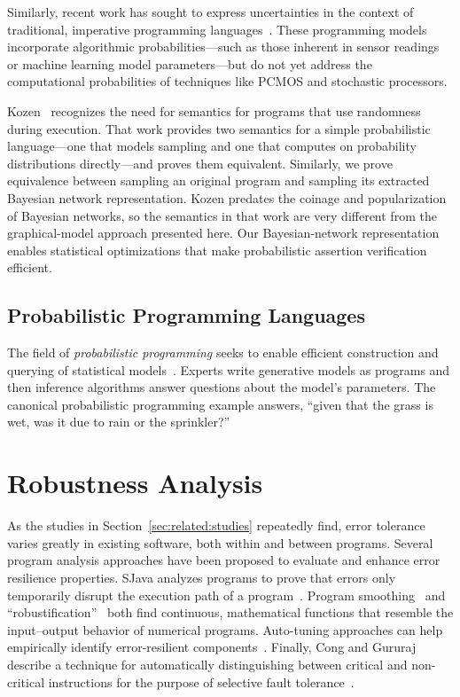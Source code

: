 Similarly, recent work has sought to express
uncertainties in the context of traditional, imperative programming
languages~\cite{uncertaint}. These programming models incorporate algorithmic
probabilities---such as those inherent in sensor readings or machine learning
model parameters---but do not yet address the computational probabilities of
techniques like PCMOS and stochastic processors.

Kozen~\cite{kozen} recognizes the need for semantics for programs
that use randomness during execution.
That work provides two semantics for a simple probabilistic
language---one that models sampling and one that computes on probability
distributions directly---and proves them equivalent.
Similarly, we prove equivalence between sampling an original program and
sampling its extracted Bayesian network representation.
Kozen predates the coinage and popularization of Bayesian networks, so
the semantics in that work are very different from the graphical-model approach
presented here.
Our Bayesian-network representation enables statistical optimizations that
make probabilistic assertion verification efficient.

\subsection{Probabilistic Programming Languages}

The field of \emph{probabilistic programming} seeks to enable efficient
construction and querying of statistical models~\cite{BBGR13, wingate-lightweight,
  church, chaganty, pfeffersample, probdsl, koller}.  Experts write
generative models as programs and then inference algorithms answer questions
about the model's parameters. The canonical probabilistic programming example
answers, ``given that the grass is wet, was it due to rain or the sprinkler?''




\section{Robustness Analysis}

As the studies in Section~\ref{sec:related:studies} repeatedly find, error
tolerance varies greatly in existing software, both within and between
programs. Several program analysis approaches have been proposed to evaluate
and enhance error resilience properties. SJava analyzes programs to prove that
errors only temporarily disrupt the execution path of a program~\cite{sjava}.
Program smoothing~\cite{smoothing-cav, smoothing-pldi, smoothing-fse} and
``robustification''~\cite{robustification} both find continuous, mathematical
functions that resemble the input--output behavior of numerical programs.
Auto-tuning approaches can help empirically identify error-resilient
components~\cite{asac}.
Finally, Cong and Gururaj describe a technique for automatically
distinguishing between critical and non-critical instructions for the purpose
of selective fault tolerance~\cite{cong-iccad}.
